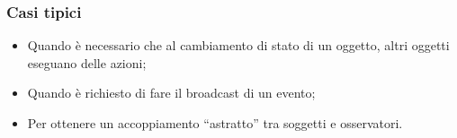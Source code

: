 \subsubsection{Casi tipici}
\begin{itemize}
\item Quando è necessario che al cambiamento di stato di un oggetto, altri oggetti eseguano delle azioni;
\item Quando è richiesto di fare il broadcast di un evento;
\item Per ottenere un accoppiamento ``astratto'' tra soggetti e osservatori.
\end{itemize}
